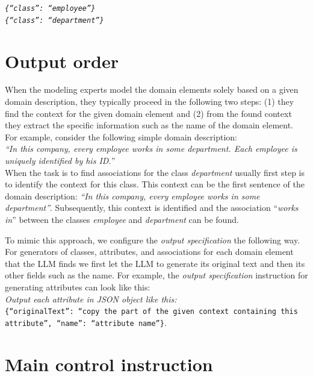 \noindent{}\textit{\texttt{\frenchspacing\{``class'': ``employee''\} \\
\{``class'': ``department''\}}}


\section{Output order}
\label{sec:output_order}

When the modeling experts model the domain elements solely based on a given domain description, they typically proceed in the following two steps: (1) they find the context for the given domain element and (2) from the found context they extract the specific information such as the name of the domain element. For example, consider the following simple domain description: \\

\noindent{}\textit{``In this company, every employee works in some department. Each employee is uniquely identified by his ID.''} \\

\noindent{}When the task is to find associations for the class \textit{department} usually first step is to identify the context for this class. This context can be the first sentence of the domain description: \textit{``In this company, every employee works in some department''}. Subsequently, this context is identified and the association ``\textit{works in}'' between the classes \textit{employee} and \textit{department} can be found.

To mimic this approach, we configure the \emph{output specification} the following way. For generators of classes, attributes, and associations for each domain element that the LLM finds we first let the LLM to generate its original text and then its other fields such as the name. For example, the \emph{output specification} instruction for generating attributes can look like this: \\

\noindent{}\textit{Output each attribute in JSON object like this:} \\
\texttt{\frenchspacing\{``originalText'': ``copy the part of the given context containing \\ this attribute'', ``name'': ``attribute name''\}}.


\section{Main control instruction}

